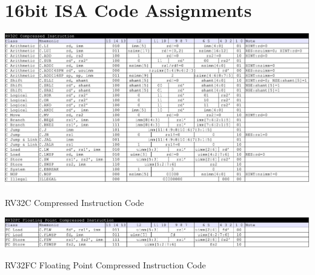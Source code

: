 \section{16bit ISA Code Assignments}

\begin{table}[H]
    \includegraphics[width=1.00\columnwidth]{./Table/ISACode_RV32C.png}
    \caption{RV32C Compressed Instruction Code}
    \label{tb:ISACode_RV32C}
\end{table}

\begin{table}[H]
    \includegraphics[width=1.00\columnwidth]{./Table/ISACode_RV32FC.png}
    \caption{RV32FC Floating Point Compressed Instruction Code}
    \label{tb:ISACode_RV32FC}
\end{table}





